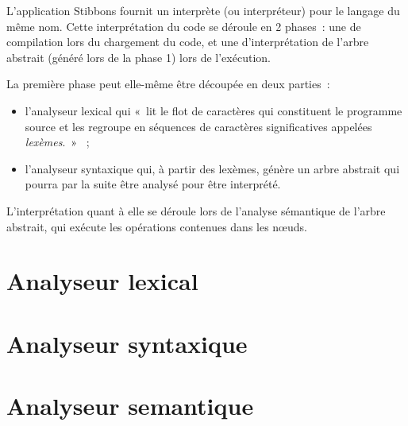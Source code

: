 L'application Stibbons fournit un interprète (ou interpréteur) pour le langage du même nom. Cette interprétation du code se déroule en 2 phases~: une de compilation lors du chargement du code, et une d'interprétation de l'arbre abstrait (généré lors de la phase 1) lors de l'exécution.

La première phase peut elle-même être découpée en deux parties~:
\begin{itemize}
\item l'analyseur lexical qui «~lit le flot de caractères qui constituent le programme source et les regroupe en séquences de caractères significatives appelées \emph{lexèmes}.~» \cite{compilateurs}~;
\item l'analyseur syntaxique qui, à partir des lexèmes, génère un arbre abstrait qui pourra par la suite être analysé pour être interprété.
\end{itemize}

L'interprétation quant à elle se déroule lors de l'analyse sémantique de l'arbre abstrait, qui exécute les opérations contenues dans les nœuds.

\section{Analyseur lexical}


\section{Analyseur syntaxique}


\section{Analyseur semantique}


